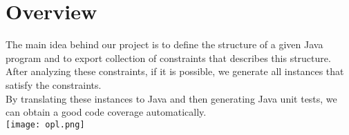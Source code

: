 \section{Overview}
\label{sec:Overview}
The main idea behind our project is to define the structure of a given Java program and to export collection of constraints that describes this structure. After analyzing these constraints, if it is possible, we generate all instances that satisfy the constraints.\\
By translating these instances to Java and then generating Java unit tests, we can obtain a good code coverage automatically.\\
\texttt{[image: opl.png]}